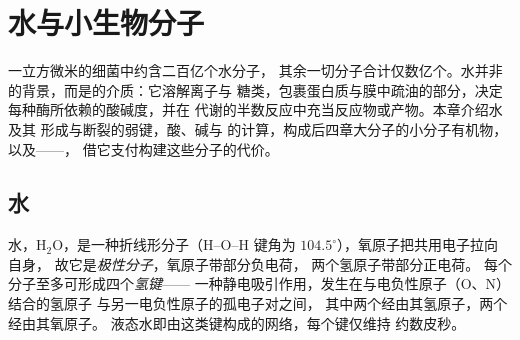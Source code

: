 \chapter{水与小生物分子}\label{ch:b1:water-small-molecules}

一立方微米的细菌中约含二百亿个水分子，
其余一切分子合计仅数亿个。水并非
的背景，而是的介质：它溶解离子与
糖类，包裹蛋白质与膜中疏油的部分，决定
每种酶所依赖的酸碱度，并在
代谢的半数反应中充当反应物或产物。本章介绍水及其
形成与断裂的弱键，酸、碱与
的计算，构成后四章大分子的小分子有机物，
以及——，
借它支付构建这些分子的代价。

\section{水}

\begin{definition}[水分子]\label{def:b1:water-small-molecules:water}
水，$\mathrm{H_2O}$，是一种折线形分子（H--O--H 键角为
$104.5^\circ$），氧原子把共用电子拉向自身，
故它是\emph{极性分子}，氧原子带部分负电荷，
两个氢原子带部分正电荷。
每个分子至多可形成四个\emph{氢键}——
一种静电吸引作用，发生在与电负性原子（O、N）结合的氢原子
与另一电负性原子的孤电子对之间，
其中两个经由其氢原子，两个经由其氧原子。
液态水即由这类键构成的网络，每个键仅维持
约数皮秒。
\end{definition}

